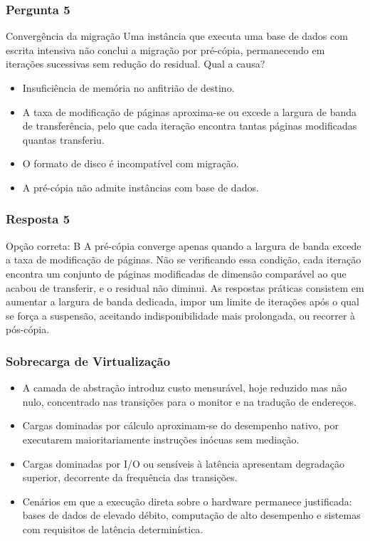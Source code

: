 \documentclass[aspectratio=169]{beamer}
\begin{document}
\begin{frame}
\frametitle{Pergunta 5}
\begin{pergunta}{Convergência da migração}
Uma instância que executa uma base de dados com escrita intensiva não conclui a migração por pré-cópia, permanecendo em iterações sucessivas sem redução do residual. Qual a causa?
\begin{itemize}
    \item[A)] Insuficiência de memória no anfitrião de destino.
    \item[B)] A taxa de modificação de páginas aproxima-se ou excede a largura de banda de transferência, pelo que cada iteração encontra tantas páginas modificadas quantas transferiu.
    \item[C)] O formato de disco é incompatível com migração.
    \item[D)] A pré-cópia não admite instâncias com base de dados.
\end{itemize}
\end{pergunta}
\end{frame}

\begin{frame}
\frametitle{Resposta 5}
\begin{resposta}{Opção correta: B}
A pré-cópia converge apenas quando a largura de banda excede a taxa de modificação de páginas. Não se verificando essa condição, cada iteração encontra um conjunto de páginas modificadas de dimensão comparável ao que acabou de transferir, e o residual não diminui. As respostas práticas consistem em aumentar a largura de banda dedicada, impor um limite de iterações após o qual se força a suspensão, aceitando indisponibilidade mais prolongada, ou recorrer à pós-cópia.
\end{resposta}
\end{frame}

\begin{frame}
\frametitle{Sobrecarga de Virtualização}
\begin{itemize}
    \setlength\itemsep{0.4cm}
    \item A camada de abstração introduz custo mensurável, hoje reduzido mas não nulo, concentrado nas transições para o monitor e na tradução de endereços.
    \item Cargas dominadas por cálculo aproximam-se do desempenho nativo, por executarem maioritariamente instruções inócuas sem mediação.
    \item Cargas dominadas por I/O ou sensíveis à latência apresentam degradação superior, decorrente da frequência das transições.
    \item Cenários em que a execução direta sobre o hardware permanece justificada: bases de dados de elevado débito, computação de alto desempenho e sistemas com requisitos de latência determinística.
\end{itemize}
\end{frame}
\end{document}
